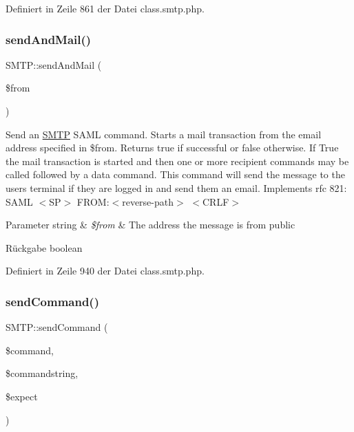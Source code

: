 Definiert in Zeile 861 der Datei class.\+smtp.\+php.

\mbox{\label{class_s_m_t_p_a5ccb22f089373bf27e9968f4cc5cfcf5}} 
\subsubsection{\texorpdfstring{send\+And\+Mail()}{sendAndMail()}}
{\footnotesize\ttfamily S\+M\+T\+P\+::send\+And\+Mail (\begin{DoxyParamCaption}\item[{}]{\$from }\end{DoxyParamCaption})}

Send an \mbox{\hyperlink{class_s_m_t_p}{S\+M\+TP}} S\+A\+ML command. Starts a mail transaction from the email address specified in \$from. Returns true if successful or false otherwise. If True the mail transaction is started and then one or more recipient commands may be called followed by a data command. This command will send the message to the users terminal if they are logged in and send them an email. Implements rfc 821\+: S\+A\+ML $<$\+S\+P$>$ F\+R\+OM\+:$<$reverse-\/path$>$ $<$\+C\+R\+L\+F$>$ 
\begin{DoxyParams}[1]{Parameter}
string & {\em \$from} & The address the message is from  public \\
\hline
\end{DoxyParams}
\begin{DoxyReturn}{Rückgabe}
boolean 
\end{DoxyReturn}


Definiert in Zeile 940 der Datei class.\+smtp.\+php.

\mbox{\label{class_s_m_t_p_a87e84c6756c5dcf01c9d8c6c185786a1}} 
\subsubsection{\texorpdfstring{send\+Command()}{sendCommand()}}
{\footnotesize\ttfamily S\+M\+T\+P\+::send\+Command (\begin{DoxyParamCaption}\item[{}]{\$command,  }\item[{}]{\$commandstring,  }\item[{}]{\$expect }\end{DoxyParamCaption})\hspace{0.3cm}{\ttfamily [protected]}}

